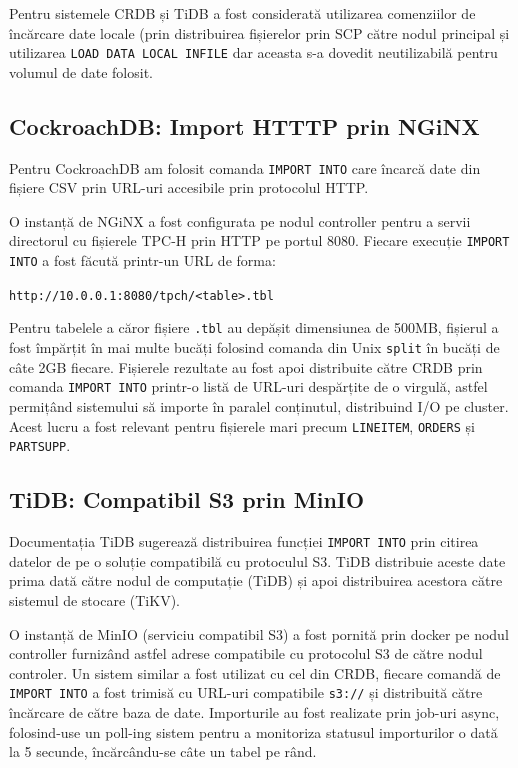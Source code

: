 Pentru sistemele CRDB și TiDB a fost considerată utilizarea comenziilor de încărcare date locale (prin distribuirea fișierelor prin SCP către nodul principal și utilizarea \texttt{LOAD DATA LOCAL INFILE} dar aceasta s-a dovedit neutilizabilă pentru volumul de date folosit.

\subsection{CockroachDB: Import HTTTP prin NGiNX}

Pentru CockroachDB am folosit comanda \texttt{IMPORT INTO} care încarcă date din fișiere CSV prin URL-uri accesibile prin protocolul HTTP.

O instanță de NGiNX a fost configurata pe nodul controller pentru a servii directorul cu fișierele TPC-H prin HTTP pe portul 8080. Fiecare execuție \texttt{IMPORT INTO} a fost făcută printr-un URL de forma:
\begin{center}
    \texttt{http://10.0.0.1:8080/tpch/<table>.tbl}
\end{center}

Pentru tabelele a căror fișiere \texttt{.tbl} au depășit dimensiunea de 500MB, fișierul a fost împărțit în mai multe bucăți folosind comanda din Unix \texttt{split} în bucăți de câte 2GB fiecare. Fișierele rezultate au fost apoi distribuite către CRDB prin comanda \texttt{IMPORT INTO} printr-o listă de URL-uri despărțite de o virgulă, astfel permițând sistemului să importe în paralel conținutul, distribuind I/O pe cluster. Acest lucru a fost relevant pentru fișierele mari precum \texttt{LINEITEM}, \texttt{ORDERS} și \texttt{PARTSUPP}.

\subsection{TiDB: Compatibil S3 prin MinIO}

Documentația TiDB sugerează distribuirea funcției \texttt{IMPORT INTO} prin citirea datelor de pe o soluție compatibilă cu protoculul S3. TiDB distribuie aceste date prima dată către nodul de computație (TiDB) și apoi distribuirea acestora către sistemul de stocare (TiKV).

O instanță de MinIO (serviciu compatibil S3) a fost pornită prin docker pe nodul controller furnizând astfel adrese compatibile cu protocolul S3 de către nodul controler. Un sistem similar a fost utilizat cu cel din CRDB, fiecare comandă de \texttt{IMPORT INTO} a fost trimisă cu URL-uri compatibile \texttt{s3://} și distribuită către încărcare de către baza de date. Importurile au fost realizate prin job-uri async, folosind-use un poll-ing sistem pentru a monitoriza statusul importurilor o dată la 5 secunde, încărcându-se câte un tabel pe rând.

